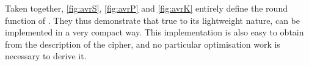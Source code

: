 \FloatBarrier

Taken together, \autoref{fig:avrS}, \autoref{fig:avrP} and \autoref{fig:avrK} entirely
define the round function of \fly. They thus demonstrate that true to its lightweight nature,
\fly can be implemented in a very compact way. This implementation is also easy to obtain from
the description of the cipher, and no particular optimisation work is necessary to derive it.
